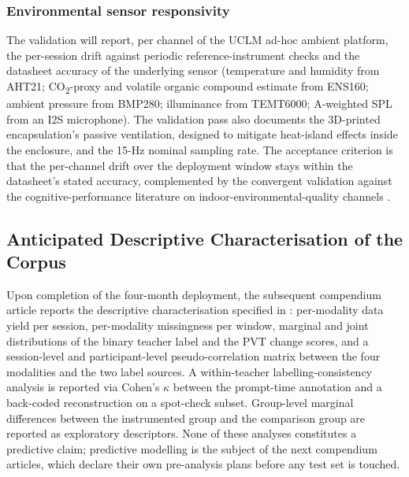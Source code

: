 \subsubsection{Environmental sensor responsivity}\label{subsec:val-ambient}

The validation will report, per channel of the UCLM ad-hoc ambient platform, the per-session drift against periodic reference-instrument checks and the datasheet accuracy of the underlying sensor (temperature and humidity from AHT21; CO\textsubscript{2}-proxy and volatile organic compound estimate from ENS160; ambient pressure from BMP280; illuminance from TEMT6000; A-weighted SPL from an I2S microphone). The validation pass also documents the 3D-printed encapsulation's passive ventilation, designed to mitigate heat-island effects inside the enclosure, and the 15-Hz nominal sampling rate. The acceptance criterion is that the per-channel drift over the deployment window stays within the datasheet's stated accuracy, complemented by the convergent validation against the cognitive-performance literature on indoor-environmental-quality channels \parencite{Wargocki2007_effects,Bako2012_classroom,Satish2012_co2,Petersen2016_classroom,Mendell2013_ventilation,Allen2016_cogfx,Twardella2012_co2_classroom}.

\subsection{Anticipated Descriptive Characterisation of the Corpus}\label{subsec:anticipated}

Upon completion of the four-month deployment, the subsequent compendium article reports the descriptive characterisation specified in : per-modality data yield per session, per-modality missingness per window, marginal and joint distributions of the binary teacher label and the PVT change scores, and a session-level and participant-level pseudo-correlation matrix between the four modalities and the two label sources. A within-teacher labelling-consistency analysis is reported via Cohen's $\kappa$ between the prompt-time annotation and a back-coded reconstruction on a spot-check subset. Group-level marginal differences between the instrumented group and the comparison group are reported as exploratory descriptors. None of these analyses constitutes a predictive claim; predictive modelling is the subject of the next compendium articles, which declare their own pre-analysis plans before any test set is touched.
